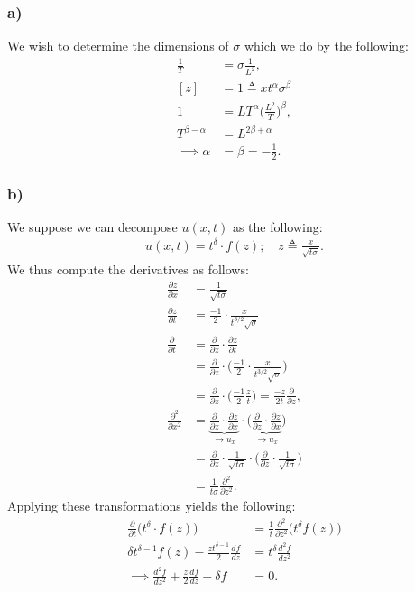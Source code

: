 \documentclass{article}
\begin{document}
\subsubsection*{a)}
We wish to determine the dimensions of $\sigma$ which we do by the following:
\begin{align*}
    \frac{1}{T} &= \sigma \frac{1}{L^2},\\
    [z] &= 1\triangleq xt^\alpha\sigma^\beta\\
    1&=LT^\alpha \Big(\frac{L^2}{T}\Big)^\beta,\\
    T^{\beta-\alpha}&= L^{2\beta + \alpha}\\
    \implies \alpha &= \beta =-\frac{1}{2}.
\end{align*}
\subsubsection*{b)}
We suppose we can decompose $u(x,t)$ as the following:
\begin{align*}
    u(x,t) =t^\delta\cdot f(z);\quad z \triangleq \frac{x}{\sqrt{t\sigma}}.
\end{align*} We thus compute the derivatives as follows:
\begin{align*}
    \frac{\partial z}{\partial x} &= \frac{1}{\sqrt{t\sigma}}\\
    \frac{\partial z}{\partial t} &= \frac{-1}{2}\cdot\frac{x}{t^{3/2}\sqrt{\sigma}}\\
    \frac{\partial }{\partial t} &= \frac{\partial }{\partial z} \cdot \frac{\partial z}{\partial t}\\
    &= \frac{\partial }{\partial z} \cdot\Big(\frac{-1}{2}\cdot\frac{x}{t^{3/2}\sqrt{\sigma}}\Big)\\
    &=\frac{\partial}{\partial z}\cdot\Big(\frac{-1}{2}\frac{z}{t}\Big) = \frac{-z}{2t}\frac{\partial}{\partial z}, \\
    \frac{\partial^2 }{\partial x^2}&= \underbrace{\frac{\partial }{\partial z} \cdot \frac{\partial z}{\partial x}}_{\to u_x}\cdot \Big(\underbrace{\frac{\partial }{\partial z} \cdot \frac{\partial z}{\partial x}}_{\to u_x}\Big)\\
    &=\frac{\partial }{\partial z} \cdot \frac{1}{\sqrt{t\sigma}}\cdot \Big(\frac{\partial }{\partial z}\cdot \frac{1}{\sqrt{t\sigma}}\Big)\\
    &=\frac{1}{t\sigma}\frac{\partial ^2 }{\partial z^2}.
\end{align*}Applying these transformations yields the following:
\begin{align*}
    \frac{\partial}{\partial t}\Big(t^{\delta}\cdot f(z)\Big) &= \frac{1}{t} \frac{\partial^2}{\partial z^2}\Big(t^{\delta}f(z)\Big)\\
    \delta t^{\delta -1}f(z)- \frac{zt^{\delta -1}}{2}\frac{df}{dz} &= t^{\delta}\frac{d^2f}{dz^2}\\
    \implies \frac{d^2f}{dz^2} + \frac{z}{2}\frac{df}{dz} - \delta f &= 0.
\end{align*}
\end{document}
